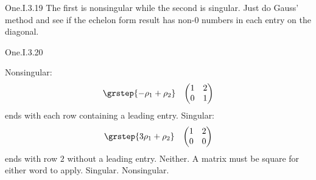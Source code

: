 \begin{ans}{One.I.3.19}
       The first is nonsingular while the second is singular.
       Just do Gauss' method and see if the echelon form result has
       non-$0$ numbers in each entry on the diagonal.
     
\end{ans}
\begin{ans}{One.I.3.20}
      \begin{exparts}
      \partsitem Nonsingular:
        \begin{eqnarray*}
          &\grstep{-\rho_1+\rho_2}
          &\begin{pmatrix}
            1  &2  \\
            0  &1
          \end{pmatrix}
        \end{eqnarray*}
        ends with each row containing a leading entry.
      \partsitem Singular:
        \begin{eqnarray*}
          &\grstep{3\rho_1+\rho_2}
          &\begin{pmatrix}
            1  &2  \\
            0  &0
          \end{pmatrix}
        \end{eqnarray*}
        ends with row \( 2 \) without a leading entry.
      \partsitem Neither.
        A matrix must be square for either word to apply.
      \partsitem Singular.
      \partsitem Nonsingular.
     \end{exparts}
    
\end{ans}
